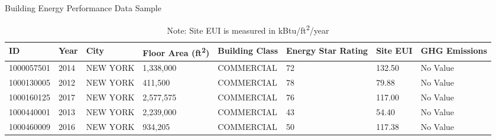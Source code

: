 \begin{table}[h]
\centering
\caption{Building Energy Performance Data Sample}
\label{tab:building_energy}
\begin{tabular}{llllllll}
\toprule
ID & Year & City & Floor Area (ft\textsuperscript{2}) & Building Class & Energy Star Rating & Site EUI & GHG Emissions \\
\midrule
1000057501 & 2014 & NEW YORK & 1,338,000 & COMMERCIAL & 72 & 132.50 & No Value \\
1000130005 & 2012 & NEW YORK & 411,500 & COMMERCIAL & 78 & 79.88 & No Value \\
1000160125 & 2017 & NEW YORK & 2,577,575 & COMMERCIAL & 76 & 117.00 & No Value \\
1000440001 & 2013 & NEW YORK & 2,239,000 & COMMERCIAL & 43 & 54.40 & No Value \\
1000460009 & 2016 & NEW YORK & 934,205 & COMMERCIAL & 50 & 117.38 & No Value \\
\bottomrule
\end{tabular}
\caption*{Note: Site EUI is measured in kBtu/ft\textsuperscript{2}/year}
\end{table} 
